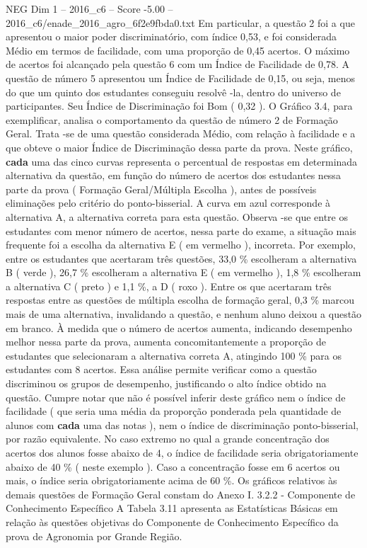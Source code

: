 \begin{textsample}{NEG Dim 1 – 2016\_c6 – Score -5.00 – 2016\_c6/enade\_2016\_agro\_6f2e9fbda0.txt}
Em particular, a questão 2 foi a que apresentou o maior poder discriminatório, com índice 0,53, e foi considerada Médio em termos de facilidade, com uma proporção de 0,45 acertos.
O máximo de acertos foi alcançado pela questão 6 com um Índice de Facilidade de 0,78.
A questão de número 5 apresentou um Índice de Facilidade de 0,15, ou seja, menos do que um quinto dos estudantes conseguiu resolvê -la, dentro do universo de participantes.
Seu Índice de Discriminação foi Bom ( 0,32 ).
O Gráfico 3.4, para exemplificar, analisa o comportamento da questão de número 2 de Formação Geral.
Trata -se de uma questão considerada Médio, com relação à facilidade e a que obteve o maior Índice de Discriminação dessa parte da prova.
Neste gráfico, \textbf{cada} uma das cinco curvas representa o percentual de respostas em determinada alternativa da questão, em função do número de acertos dos estudantes nessa parte da prova ( Formação Geral/Múltipla Escolha ), antes de possíveis eliminações pelo critério do ponto-bisserial.
A curva em azul corresponde à alternativa A, a alternativa correta para esta questão.
Observa -se que entre os estudantes com menor número de acertos, nessa parte do exame, a situação mais frequente foi a escolha da alternativa E ( em vermelho ), incorreta.
Por exemplo, entre os estudantes que acertaram três questões, 33,0 \% escolheram a alternativa B ( verde ), 26,7 \% escolheram a alternativa E ( em vermelho ), 1,8 \% escolheram a alternativa C ( preto ) e 1,1 \%, a D ( roxo ).
Entre os que acertaram três respostas entre as questões de múltipla escolha de formação geral, 0,3 \% marcou mais de uma alternativa, invalidando a questão, e nenhum aluno deixou a questão em branco.
À medida que o número de acertos aumenta, indicando desempenho melhor nessa parte da prova, aumenta concomitantemente a proporção de estudantes que selecionaram a alternativa correta A, atingindo 100 \% para os estudantes com 8 acertos.
Essa análise permite verificar como a questão discriminou os grupos de desempenho, justificando o alto índice obtido na questão.
Cumpre notar que não é possível inferir deste gráfico nem o índice de facilidade ( que seria uma média da proporção ponderada pela quantidade de alunos com \textbf{cada} uma das notas ), nem o índice de discriminação ponto-bisserial, por razão equivalente.
No caso extremo no qual a grande concentração dos acertos dos alunos fosse abaixo de 4, o índice de facilidade seria obrigatoriamente abaixo de 40 \% ( neste exemplo ).
Caso a concentração fosse em 6 acertos ou mais, o índice seria obrigatoriamente acima de 60 \%.
Os gráficos relativos às demais questões de Formação Geral constam do Anexo I. 3.2.2 - Componente de Conhecimento Específico A Tabela 3.11 apresenta as Estatísticas Básicas em relação às questões objetivas do Componente de Conhecimento Específico da prova de Agronomia por Grande Região.

\end{textsample}
